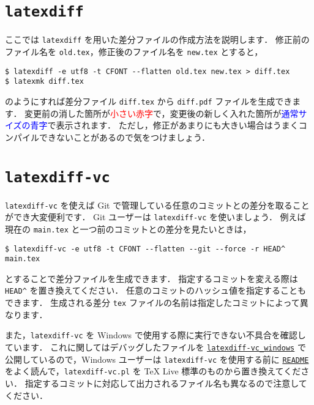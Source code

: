 \section{\texttt{latexdiff}}
\label{sec:latexdiff}

ここでは \verb|latexdiff| を用いた差分ファイルの作成方法を説明します．
修正前のファイル名を \verb|old.tex|，修正後のファイル名を \verb|new.tex| とすると，
\begin{tcolorbox}[title={\texttt{latexdiff} を使用した差分ファイルの生成方法}]
\begin{verbatim}
$ latexdiff -e utf8 -t CFONT --flatten old.tex new.tex > diff.tex
$ latexmk diff.tex
\end{verbatim}
\end{tcolorbox}
\noindent
のようにすれば差分ファイル \verb|diff.tex| から \verb|diff.pdf| ファイルを生成できます．
変更前の消した箇所が\textcolor{red}{\scriptsize 小さい赤字}で，変更後の新しく入れた箇所が\textcolor{blue}{\sffamily 通常サイズの青字}で表示されます．
ただし，修正があまりにも大きい場合はうまくコンパイルできないことがあるので気をつけましょう．

\section{\texttt{latexdiff-vc}}
\label{sec:latexdiff-vc}

\verb|latexdiff-vc| を使えば Git で管理している任意のコミットとの差分を取ることができ大変便利です．
Git ユーザーは \verb|latexdiff-vc| を使いましょう．
例えば現在の \verb|main.tex| と一つ前のコミットとの差分を見たいときは，
\begin{tcolorbox}[title={\texttt{latexdiff-vc} を使用した差分ファイルの生成方法}]
\begin{verbatim}
$ latexdiff-vc -e utf8 -t CFONT --flatten --git --force -r HEAD^ main.tex
\end{verbatim}
\end{tcolorbox}
\noindent
とすることで差分ファイルを生成できます．
指定するコミットを変える際は \verb|HEAD^| を置き換えてください．
任意のコミットのハッシュ値を指定することもできます．
生成される差分 \verb|tex| ファイルの名前は指定したコミットによって異なります．

また，\verb|latexdiff-vc| を Windows で使用する際に実行できない不具合を確認しています．
これに関してはデバッグしたファイルを \href{https://github.com/Yuki-MATSUKAWA/latexdiff-vc_windows}{\texttt{latexdiff-vc\_windows}} で公開しているので，Windows ユーザーは \verb|latexdiff-vc| を使用する前に \href{https://github.com/Yuki-MATSUKAWA/latexdiff-vc_windows?tab=readme-ov-file#readme}{\texttt{README}} をよく読んで，\verb|latexdiff-vc.pl| を TeX Live 標準のものから置き換えてください．
指定するコミットに対応して出力されるファイル名も異なるので注意してください．



